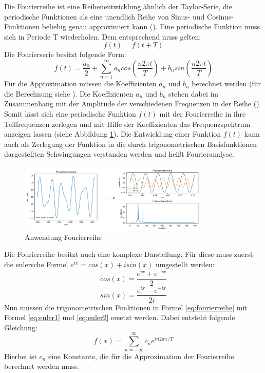 Die Fourierreihe ist eine Reihenentwicklung ähnlich der Taylor-Serie, die periodische Funktionen als eine unendlich Reihe von Sinus- und Cosinus-Funktionen beliebig genau approximiert kann (\cite[K. 11.4]{krenor 11}). Eine periodische Funktion muss sich in Periode T wiederholen. Dem entsprechend muss gelten:
\begin{equation}
f(t) = f(t + T)
\end{equation}
Die Fourierserie besitzt folgende Form:
\begin{equation}
f(t) = \frac{a_0}{2} + \sum_{n=1}^{\infty} a_n cos \left( \frac{n2 \pi t}{T} \right) + b_n sin \left( \frac{n2 \pi t}{T} \right)
\label{eq:fourierreihe}
\end{equation}
Für die Approximation müssen die Koeffizienten $a_n$ und $b_n$ berechnet werden (für die Berechnung siehe \cite[K. 11.2]{krenor 11}). Die Koeffizienten $a_n$ und $b_n$ stehen dabei im Zusammenhang mit der Amplitude der verschiedenen Frequenzen in der Reihe (\cite[K. 2.5]{scho 05}). Somit lässt sich eine periodische Funktion $f(t)$ mit der Fourierreihe in ihre Teilfrequenzen zerlegen und mit Hilfe der Koeffizienten das Frequenzspektrum anzeigen lassen (siehe Abbildung \ref{fig:fourierreihe}).
\newline
Die Entwicklung einer Funktion $f(t)$ kann auch als Zerlegung der Funktion in die durch trigonometrischen Basisfunktionen dargestellten Schwingungen verstanden werden und heißt Fourieranalyse.
\begin{figure}
\centering
 \includegraphics[width=0.8\textwidth]{Pictures/Fourierreihe.png}
\caption{Anwendung Fourierreihe}
\label{fig:fourierreihe}
\end{figure} 
\newline
Die Fourierreihe besitzt auch eine komplexe Darstellung. Für diese muss zuerst die eulersche Formel $e^{ix} = cos(x) + i sin(x)$ umgestellt werden:
\begin{equation}
cos(x) = \frac{e^{ix} + e^{-ix}}{2}
\label{eq:euler1}
\end{equation}
\begin{equation}
sin(x) = \frac{e^{ix} - e^{-ix}}{2i}
\label{eq:euler2}
\end{equation}
Nun müssen die trigonometrischen Funktionen in Formel \ref{eq:fourierreihe} mit Formel \ref{eq:euler1} und \ref{eq:euler2} ersetzt werden.
Dabei entsteht folgende Gleichung:
\begin{equation}
f(x) = \sum_{n=-\infty}^{\infty} c_{n} e^{in2\pi x / T}
\label{FS}
\end{equation}
Hierbei ist $c_n$ eine Konstante, die für die Approximation der Fourierreihe berechnet werden muss.


